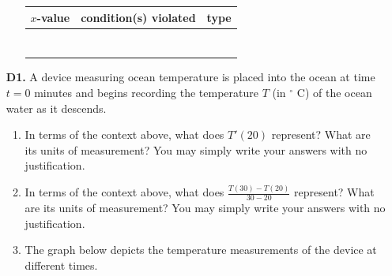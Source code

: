 \documentclass[11pt]{article}
\begin{document}
\begin{enumerate}
\begin{enumerate}
\begin{minipage}[t]{0.4\textwidth}
\end{minipage}
\hspace{1em} %
\begin{minipage}[t]{0.40\textwidth}
\vspace{0pt}
\begin{tabular}{|c|c|c|}
    \hline
    \textbf{$x$-value} & \textbf{condition(s) violated} & \textbf{type} \\
    \hline
     & & \\
     & & \\
     & & \\
     & & \\
     & & \\
     & & \\
     & & \\
     \hline
\end{tabular}
\end{minipage}
\end{enumerate}
\newpage
\item[\textbf{D1.}]
A device measuring ocean temperature is placed into the ocean at time $t=0$ minutes and begins recording the temperature $T$ (in ${}^{\circ}$ C) of the ocean water as it descends.

\begin{enumerate}
    \item In terms of the context above, what does $T'(20)$ represent? What are its units of measurement? You may simply write your answers with no justification.
        \vfill
    \item In terms of the context above, what does $\displaystyle\frac{T(30)-T(20)}{30-20}$ represent? What are its units of measurement? You may simply write your answers with no justification.
        \vfill
    \item  The graph below depicts the temperature measurements of the device at different times.

    

\end{enumerate}
\end{enumerate}
\end{document}
